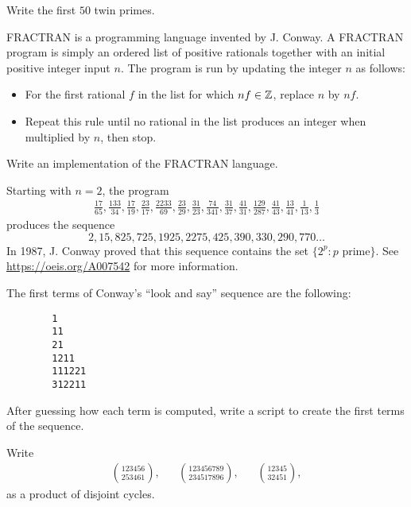\begin{prob}
	\label{prob:twin}
	Write the first $50$ twin primes. 
\end{prob}

\begin{prob}
	\label{prob:fractran}
	FRACTRAN is a programming language invented by J. Conway. A FRACTRAN program
	is simply an ordered list of positive rationals together with an initial
	positive integer input $n$. The program is run by updating the integer $n$
	as follows:
	\begin{itemize}
		\item For the first rational $f$ in the list for which $nf\in\mathbb{Z}$,
			replace $n$ by $nf$.
		\item Repeat this rule until no rational in the list produces an
			integer when multiplied by $n$, then stop.
	\end{itemize}
	Write an implementation of the FRACTRAN language. 

	Starting with $n=2$, the program 
	\begin{align*}
		\frac{17}{65}, \frac{133}{34}, \frac{17}{19}, \frac{23}{17}, \frac{2233}{69},
		\frac{23}{29}, \frac{31}{23}, \frac{74}{341}, \frac{31}{37}, \frac{41}{31}, \frac{129}{287}, \frac{41}{43}, \frac{13}{41}, \frac{1}{13}, \frac{1}{3}
	\end{align*}
	produces the sequence 
	\[
	2, 15, 825, 725, 1925, 2275, 425, 390, 330, 290, 770\dots
	\]
	In 1987, J. Conway proved that this sequence contains the set
	$\{2^p:p\text{ prime}\}$.  See \url{https://oeis.org/A007542} for more
	information.
\end{prob}

\begin{prob}
	\label{prob:lookandsay}
	The first terms of Conway's ``look and say'' sequence are the following:
	\begin{lstlisting}
		1
		11
		21
		1211
		111221
		312211
	\end{lstlisting}
	After guessing how each term is computed, write a script to create the
	first terms of the sequence.
\end{prob}


\begin{prob}
    Write 
    \begin{align*}
	\binom{123456}{253461},
    &&
    \binom{123456789}{234517896},
    &&
    \binom{12345}{32451},
    \end{align*}
    as a product of disjoint cycles. 
\end{prob}

